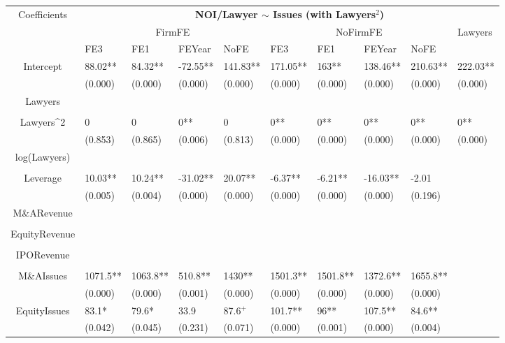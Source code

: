\documentclass{article}
\begin{document}
\begin{table}[H]
\centering
\begin{tabular}{|clllllllll|}
\hline
\multirow{3}{*}{Coefficients} & \multicolumn{9}{c|}{\textbf{NOI/Lawyer $\sim$ Issues (with Lawyers$^2$)}} \\
\cline{2-10}
& \multicolumn{4}{c}{FirmFE} & \multicolumn{4}{c}{NoFirmFE} & \multirow{2}{*}{Lawyers} \\
\cline{2-9}
& FE3 & FE1 & FEYear & NoFE & FE3 & FE1 & FEYear & NoFE &  \\
\hline
 
Intercept & 88.02** & 84.32** & -72.55** & 141.83** & 171.05** & 163** & 138.46** & 210.63** & 222.03** \\ 
   & (0.000) & (0.000) & (0.000) & (0.000) & (0.000) & (0.000) & (0.000) & (0.000) & (0.000) \\ 
  Lawyers &  &  &  &  &  &  &  &  &  \\ 
   &  &  &  &  &  &  &  &  &  \\ 
  Lawyers^2 & 0 & 0 & 0** & 0 & 0** & 0** & 0** & 0** & 0** \\ 
   & (0.853) & (0.865) & (0.006) & (0.813) & (0.000) & (0.000) & (0.000) & (0.000) & (0.000) \\ 
  log(Lawyers) &  &  &  &  &  &  &  &  &  \\ 
   &  &  &  &  &  &  &  &  &  \\ 
  Leverage & 10.03** & 10.24** & -31.02** & 20.07** & -6.37** & -6.21** & -16.03** & -2.01 &  \\ 
   & (0.005) & (0.004) & (0.000) & (0.000) & (0.000) & (0.000) & (0.000) & (0.196) &  \\ 
  M\&ARevenue &  &  &  &  &  &  &  &  &  \\ 
   &  &  &  &  &  &  &  &  &  \\ 
  EquityRevenue &  &  &  &  &  &  &  &  &  \\ 
   &  &  &  &  &  &  &  &  &  \\ 
  IPORevenue &  &  &  &  &  &  &  &  &  \\ 
   &  &  &  &  &  &  &  &  &  \\ 
  M\&AIssues & 1071.5** & 1063.8** & 510.8** & 1430** & 1501.3** & 1501.8** & 1372.6** & 1655.8** &  \\ 
   & (0.000) & (0.000) & (0.001) & (0.000) & (0.000) & (0.000) & (0.000) & (0.000) &  \\ 
  EquityIssues & 83.1* & 79.6* & 33.9 & 87.6$^{+}$ & 101.7** & 96** & 107.5** & 84.6** &  \\ 
   & (0.042) & (0.045) & (0.231) & (0.071) & (0.000) & (0.001) & (0.000) & (0.004) &  \\ 

\end{tabular}
\end{table}
\end{document}
